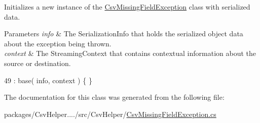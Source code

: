Initializes a new instance of the \hyperlink{a00045}{Csv\-Missing\-Field\-Exception} class with serialized data. 


\begin{DoxyParams}{Parameters}
{\em info} & The Serialization\-Info that holds the serialized object data about the exception being thrown.\\
\hline
{\em context} & The Streaming\-Context that contains contextual information about the source or destination.\\
\hline
\end{DoxyParams}

\begin{DoxyCode}
49 : base( info, context ) \{ \}
\end{DoxyCode}


The documentation for this class was generated from the following file\-:\begin{DoxyCompactItemize}
\item 
packages/\-Csv\-Helper..../src/\-Csv\-Helper/\hyperlink{a00196}{Csv\-Missing\-Field\-Exception.\-cs}\end{DoxyCompactItemize}
